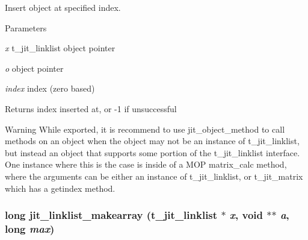 Insert object at specified index. 
\begin{DoxyParams}{Parameters}
\item[{\em x}]t\_\-jit\_\-linklist object pointer \item[{\em o}]object pointer \item[{\em index}]index (zero based)\end{DoxyParams}
\begin{DoxyReturn}{Returns}
index inserted at, or -\/1 if unsuccessful
\end{DoxyReturn}
\begin{DoxyWarning}{Warning}
While exported, it is recommend to use jit\_\-object\_\-method to call methods on an object when the object may not be an instance of t\_\-jit\_\-linklist, but instead an object that supports some portion of the t\_\-jit\_\-linklist interface. One instance where this is the case is inside of a MOP matrix\_\-calc method, where the arguments can be either an instance of t\_\-jit\_\-linklist, or t\_\-jit\_\-matrix which has a getindex method. 
\end{DoxyWarning}
\hypertarget{group__linklistmod_ga46b1ab616dda1cd288c0ef2bcff09ae8}{
\subsubsection[{jit\_\-linklist\_\-makearray}]{\setlength{\rightskip}{0pt plus 5cm}long jit\_\-linklist\_\-makearray (t\_\-jit\_\-linklist $\ast$ {\em x}, \/  void $\ast$$\ast$ {\em a}, \/  long {\em max})}}
\label{group__linklistmod_ga46b1ab616dda1cd288c0ef2bcff09ae8}


